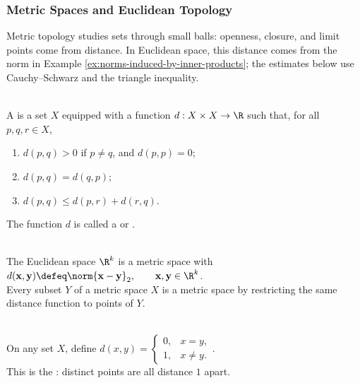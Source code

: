 \subsubsection{Metric Spaces and Euclidean Topology}


Metric topology studies sets through small balls: openness, closure, and limit points come from distance.
In Euclidean space, this distance comes from the norm in Example \ref{ex:norms-induced-by-inner-products}; the estimates below use Cauchy--Schwarz and the triangle inequality.

\begin{definition} \label{def:metric-space} \\
A  is a set $X$ equipped with a function $d:X\times X\to\R$ such that, for all $p,q,r\in X$,
\begin{enumerate}[label=\roman*.]
\setlength{\itemsep}{0pt}
\item $d(p,q)>0$ if $p\neq q$, and $d(p,p)=0$;
\item $d(p,q)=d(q,p)$;
\item $d(p,q)\leq d(p,r)+d(r,q)$.
\end{enumerate}
The function $d$ is called a  or .
\end{definition}

\begin{example} \label{ex:euclidean-metric-and-subspaces} \\
The Euclidean space $\R^k$ is a metric space with $d(\mathbf{x},\mathbf{y})\defeq\norm{\mathbf{x}-\mathbf{y}}_2,\qquad \mathbf{x},\mathbf{y}\in\R^k$.\\
Every subset $Y$ of a metric space $X$ is a metric space by restricting the same distance function to points of $Y$.
\end{example}

\begin{example} \label{ex:discrete-metric} \\
On any set $X$, define $d(x,y)=
\begin{cases}
0, & x=y,\\
1, & x\neq y.
\end{cases}$.\\
This is the : distinct points are all distance $1$ apart.
\end{example}

